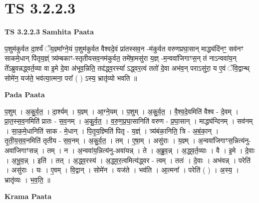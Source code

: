 \documentclass[17pt]{extarticle}
\begin{document}
\section{ TS 3.2.2.3 }

\textbf{TS 3.2.2.3 } \newline
\textbf{Samhita Paata} \newline

प॒शुम॑कुर्वत दा॒र्श्यं ॅय॒ज्ञ्मा᳚ग्ने॒यं प॒शुम॑कुर्वत वैश्वदे॒वं प्रा॑तस्सव॒न -म॑कुर्वत वरुणप्रघा॒सान् माद्ध्य॑दिंनꣳ॒॒ सव॑नꣳ साकमे॒धान् पि॑तृय॒ज्ञ्ं त्र्य॑म्बकाꣳ-स्तृतीयसव॒नम॑कुर्वत॒ तमे॑षा॒मसु॑रा य॒ज्ञ् -म॒न्ववा॑जिगाꣳस॒न् तं नाऽन्ववा॑य॒न् ते᳚ऽब्रुवन्नद्ध्वर्त॒व्या वा इ॒मे दे॒वा अ॑भूव॒न्निति॒ तद॑द्ध्व॒रस्या᳚ ऽद्ध्वर॒त्वं ततो॑ दे॒वा अभ॑व॒न् पराऽसु॑रा॒ य ए॒वं ॅवि॒द्वान्थ् सोमे॑न॒ यज॑ते॒ भव॑त्या॒त्मना॒ परा᳚ ( ) ऽस्य॒ भ्रातृ॑व्यो भवति ॥ \newline

\textbf{Pada Paata} \newline

प॒शुम् । अ॒कु॒र्व॒त॒ । दा॒र्श्यम् । य॒ज्ञ्म् । आ॒ग्ने॒यम् । प॒शुम् । अ॒कु॒र्व॒त॒ । वै॒श्व॒दे॒वमिति॑ वैश्व - दे॒वम् । प्रा॒त॒स्स॒व॒नमिति॑ प्रातः - स॒व॒नम् । अ॒कु॒र्व॒त॒ । व॒रु॒ण॒प्र॒घा॒सानिति॑ वरुण - प्र॒घा॒सान् । माद्ध्य॑न्दिनम् । सव॑नम् । सा॒क॒मे॒धानिति॑ साक - मे॒धान् । पि॒तृ॒य॒ज्ञ्मिति॑ पितृ - य॒ज्ञ्ं । त्र्य॑बंका॒निति॒ त्रि - अ॒बं॒का॒न् । तृ॒ती॒य॒स॒व॒नमिति॑ तृतीय - स॒व॒नम् । अ॒कु॒र्व॒त॒ । तम् । ए॒षा॒म् । असु॑राः । य॒ज्ञ्म् । अ॒न्ववा॑जिगाꣳस॒न्नित्य॑नु-अवा॑जिगाꣳसन्न् । तम् । न । अ॒न्ववा॑य॒न्नित्य॑नु-अवा॑यन्न् । ते । अ॒ब्रु॒व॒न्न् । अ॒द्ध्व॒र्त॒व्याः । वै । इ॒मे । दे॒वाः । अ॒भू॒व॒न्न् । इति॑ । तत् । अ॒द्ध्व॒रस्य॑ । अ॒द्ध्व॒र॒त्वमित्य॑द्ध्वर - त्वम् । ततः॑ । दे॒वाः । अभ॑वन्न् । परेति॑ । असु॑राः । यः । ए॒वम् । वि॒द्वान् । सोमे॑न । यज॑ते । भव॑ति । आ॒त्मना᳚ । परेति॑ ( ) । अ॒स्य॒ । भ्रातृ॑व्यः । भ॒व॒ति॒ ॥  \newline


\textbf{Krama Paata} \newline
\end{document}
